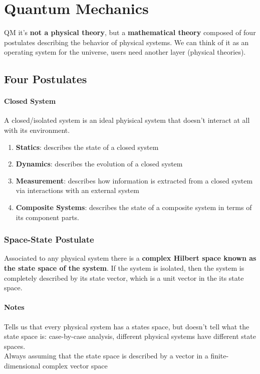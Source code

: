 \documentclass[10pt]{report}
\begin{document}
\section{Quantum Mechanics}
QM it's \textbf{not a physical theory}, but a \textbf{mathematical theory} composed of four postulates describing the behavior of physical systems. We can think of it as an operating system for the universe, users need another layer (physical theories).
\subsection{Four Postulates}
\paragraph{Closed System} A closed/isolated system is an ideal phyisical system that doesn't interact at all with its environment.
\begin{enumerate}
	\item \textbf{Statics}: describes the state of a closed system
	\item \textbf{Dynamics}: describes the evolution of a closed system
	\item \textbf{Measurement}: describes how information is extracted from a closed system via interactions with an external system
	\item \textbf{Composite Systems}: describes the state of a composite system in terms of its component parts.
\end{enumerate}
\subsubsection{Space-State Postulate} Associated to any physical system there is a \textbf{complex Hilbert space known as the state space of the system}. If the system is isolated, then the system is completely described by its state vector, which is a unit vector in the its state space.
\paragraph{Notes} Tells us that every physical system has a states space, but doesn't tell what the state space is: case-by-case analysis, different physical systems have different state spaces.\\
Always assuming that the state space is described by a vector in a finite-dimensional complex vector space
\end{document}
